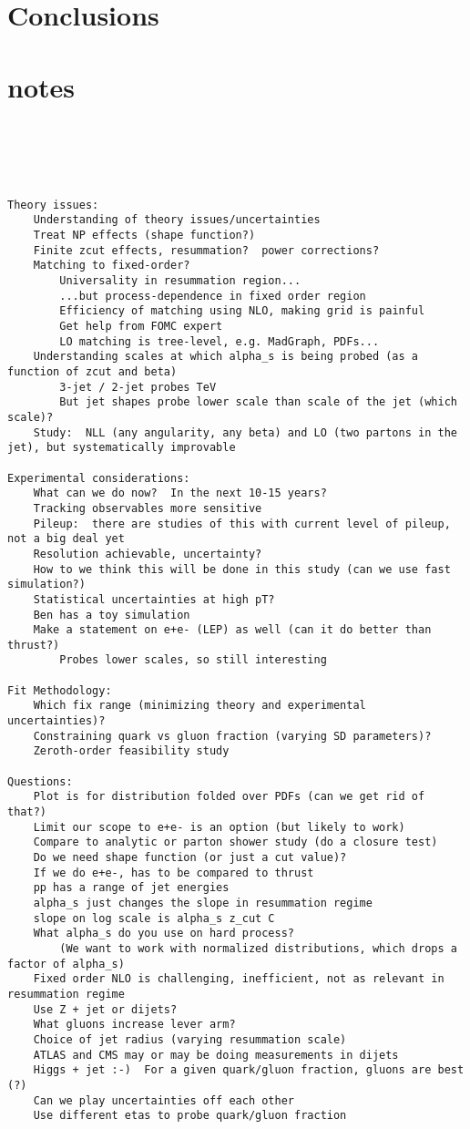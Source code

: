 \documentclass[11pt,letterpaper]{article}
\begin{document}
\section{Conclusions}

\appendix

\section{notes}

\begin{verbatim}





Theory issues:
	Understanding of theory issues/uncertainties
	Treat NP effects (shape function?)
	Finite zcut effects, resummation?  power corrections?
	Matching to fixed-order?
		Universality in resummation region...
		...but process-dependence in fixed order region
		Efficiency of matching using NLO, making grid is painful
		Get help from FOMC expert
		LO matching is tree-level, e.g. MadGraph, PDFs...
	Understanding scales at which alpha_s is being probed (as a function of zcut and beta)
		3-jet / 2-jet probes TeV
		But jet shapes probe lower scale than scale of the jet (which scale)?
	Study:  NLL (any angularity, any beta) and LO (two partons in the jet), but systematically improvable

Experimental considerations:
	What can we do now?  In the next 10-15 years?
	Tracking observables more sensitive
	Pileup:  there are studies of this with current level of pileup, not a big deal yet
	Resolution achievable, uncertainty?
	How to we think this will be done in this study (can we use fast simulation?)
	Statistical uncertainties at high pT?
	Ben has a toy simulation
	Make a statement on e+e- (LEP) as well (can it do better than thrust?)
		Probes lower scales, so still interesting

Fit Methodology:
	Which fix range (minimizing theory and experimental uncertainties)?
	Constraining quark vs gluon fraction (varying SD parameters)?
	Zeroth-order feasibility study

Questions:
	Plot is for distribution folded over PDFs (can we get rid of that?)
	Limit our scope to e+e- is an option (but likely to work)
	Compare to analytic or parton shower study (do a closure test)
	Do we need shape function (or just a cut value)?
	If we do e+e-, has to be compared to thrust
	pp has a range of jet energies
	alpha_s just changes the slope in resummation regime
	slope on log scale is alpha_s z_cut C
	What alpha_s do you use on hard process?
		(We want to work with normalized distributions, which drops a factor of alpha_s)
	Fixed order NLO is challenging, inefficient, not as relevant in resummation regime
	Use Z + jet or dijets?
	What gluons increase lever arm?
	Choice of jet radius (varying resummation scale)
	ATLAS and CMS may or may be doing measurements in dijets
	Higgs + jet :-)  For a given quark/gluon fraction, gluons are best (?)
	Can we play uncertainties off each other
	Use different etas to probe quark/gluon fraction


\end{verbatim}
\end{document}
